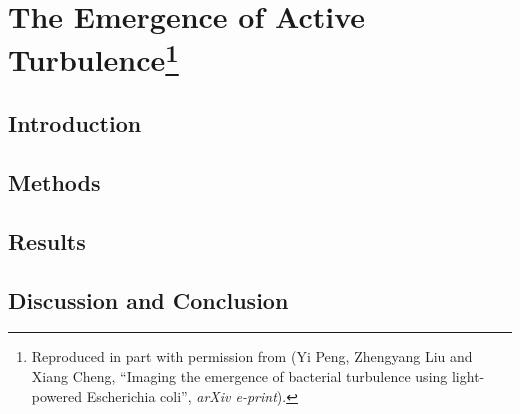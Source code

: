 \chapter[The Emergence of Active Turbulence]{The Emergence of Active Turbulence\footnote[1]{
Reproduced in part with permission from (Yi Peng, Zhengyang Liu and Xiang Cheng, ``Imaging the emergence of bacterial turbulence using light-powered Escherichia coli'', \textit{arXiv e-print}).
}}
\label{the-emergence-of-active-turbulence}

\section{Introduction}

\section{Methods}

\section{Results}

\section{Discussion and Conclusion}
